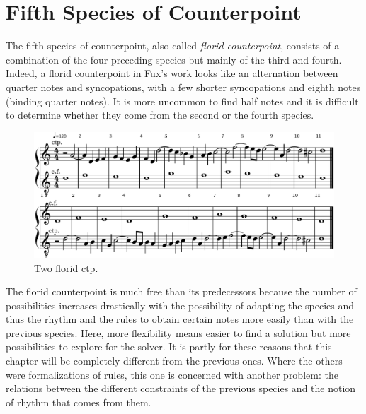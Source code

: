 \chapter{Fifth Species of Counterpoint}\label{ch:5SP}
The fifth species of counterpoint, also called \emph{florid counterpoint}, consists of a combination of the four preceding species but mainly of the third and fourth. Indeed, a florid counterpoint in Fux's work looks like an alternation between quarter notes and syncopations, with a few shorter syncopations and eighth notes (binding quarter notes). It is more uncommon to find half notes and it is difficult to determine whether they come from the second or the fourth species.
\begin{figure}[h]
    \centering
    \includegraphics[width=5in]{Images/the_fifth_species.png}
    \caption{Two florid ctp.  }
\end{figure}

The florid counterpoint is much free than its predecessors because the number of possibilities increases drastically with the possibility of adapting the species and thus the rhythm and the rules to obtain certain notes more easily than with the previous species. Here, more flexibility means easier to find a solution but more possibilities to explore for the solver. It is partly for these reasons that this chapter will be completely different from the previous ones. Where the others were formalizations of rules, this one is concerned with another problem: the relations between the different constraints of the previous species and the notion of rhythm that comes from them.

